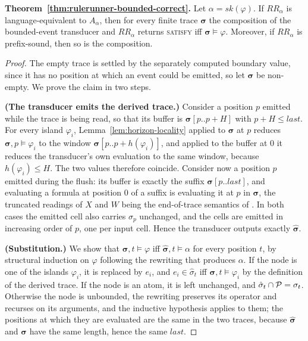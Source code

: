 \noindent
\textbf{Theorem~\ref{thm:rulerunner-bounded-correct}.}
Let $\alpha = sk(\varphi)$. If $RR_\alpha$ is language-equivalent to $A_\alpha$,
then for every finite trace $\boldsymbol{\sigma}$ the composition of the
bounded-event transducer and $RR_\alpha$ returns \textsc{satisfy} iff
$\boldsymbol{\sigma}\models\varphi$. Moreover, if $RR_\alpha$ is prefix-sound,
then so is the composition.

\begin{proof}
The empty trace is settled by the separately computed boundary value, since it
has no position at which an event could be emitted, so let
$\boldsymbol{\sigma}$ be non-empty. We prove the claim in two steps.

\medskip
\noindent
\textbf{(The transducer emits the derived trace.)} Consider a position $p$
emitted while the trace is being read, so that its buffer is
$\boldsymbol{\sigma}[p..p+H]$ with $p+H\leq last$. For every island
$\varphi_i$, Lemma~\ref{lem:horizon-locality} applied to $\boldsymbol{\sigma}$
at $p$ reduces $\boldsymbol{\sigma},p\models\varphi_i$ to the window
$\boldsymbol{\sigma}[p..p+h(\varphi_i)]$, and applied to the buffer at $0$ it
reduces the transducer's own evaluation to the same window, because
$h(\varphi_i)\leq H$. The two values therefore coincide. Consider now a
position $p$ emitted during the flush: its buffer is exactly the suffix
$\boldsymbol{\sigma}[p..last]$, and evaluating a formula at position $0$ of a
suffix is evaluating it at $p$ in $\boldsymbol{\sigma}$, the truncated
readings of $X$ and $W$ being the end-of-trace semantics of \ltlf. In both
cases the emitted cell also carries $\sigma_p$ unchanged, and the cells are
emitted in increasing order of $p$, one per input cell. Hence the transducer
outputs exactly $\widehat{\boldsymbol{\sigma}}$.

\medskip
\noindent
\textbf{(Substitution.)} We show that $\boldsymbol{\sigma},t\models\varphi$ iff
$\widehat{\boldsymbol{\sigma}},t\models\alpha$ for every position $t$, by
structural induction on $\varphi$ following the rewriting that produces
$\alpha$. If the node is one of the islands $\varphi_i$, it is replaced by
$e_i$, and $e_i\in\hat{\sigma}_t$ iff $\boldsymbol{\sigma},t\models\varphi_i$
by the definition of the derived trace. If the node is an atom, it is left
unchanged, and $\hat{\sigma}_t\cap{\ensuremath{\mathcal{P}}}=\sigma_t$. Otherwise the node is
unbounded, the rewriting preserves its operator and recurses on its arguments,
and the inductive hypothesis applies to them; the positions at which they are
evaluated are the same in the two traces, because
$\widehat{\boldsymbol{\sigma}}$ and $\boldsymbol{\sigma}$ have the same length,
hence the same $last$.


\end{proof}
